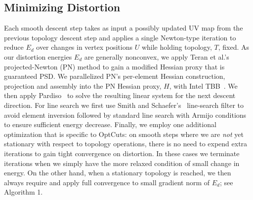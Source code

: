 \subsection{Minimizing Distortion}
\label{sec:descentStep}

Each smooth descent step takes as input a possibly updated UV map from the previous topology descent step and applies a single Newton-type iteration to reduce $E_d$ over changes in vertex positions $U$ while holding topology, $T$, fixed.
%
As our distortion energies $E_{d}$ are generally nonconvex, we apply Teran et al.'s\  projected-Newton (PN) method to gain a modified Hessian proxy that is guaranteed PSD. We parallelized PN's per-element Hessian construction,   projection and assembly into the PN Hessian proxy, $H$, with Intel TBB~\cite{Reinders2007Intel}.  We then apply Pardiso~\cite{pardiso-6.0a, pardiso-6.0b} to solve the resulting linear system for the next descent direction. For line search we first use Smith and Schaefer's~ line-search filter to avoid element inversion followed by standard line search with Armijo conditions~ to ensure sufficient energy decrease. Finally, we employ one additional optimization that is specific to OptCuts: on smooth steps where we are \emph{not} yet stationary with respect to topology operations, there is no need to expend extra iterations to gain tight convergence on distortion. In these cases we terminate iterations when we simply have the more relaxed condition of small change in energy. On the other hand, when a stationary topology is reached, we then always require and apply full convergence to small gradient norm of $E_d$; see Algorithm 1.

